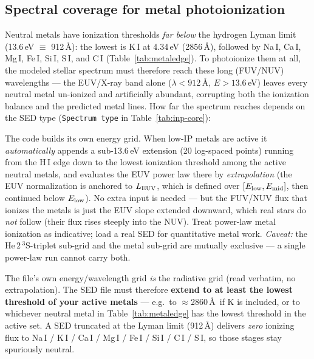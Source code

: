 \documentclass[english,a4paper]{kiseon_memo}
\begin{document}
\subsection{Spectral coverage for metal photoionization}\label{sec:metalsed}
Neutral metals have ionization thresholds \emph{far below} the hydrogen Lyman
limit (13.6\,eV $\equiv$ 912\,\AA): the lowest is K\,I at 4.34\,eV (2856\,\AA),
followed by Na\,I, Ca\,I, Mg\,I, Fe\,I, Si\,I, S\,I, and C\,I
(Table~\ref{tab:metaledge}). To photoionize them at all, the modeled stellar
spectrum must therefore reach these long (FUV/NUV) wavelengths --- the EUV/X-ray
band alone ($\lambda<912$\,\AA, $E>13.6$\,eV) leaves every neutral metal
un-ionized and artificially abundant, corrupting both the ionization balance and
the predicted metal lines. How far the spectrum reaches depends on the SED type
(\texttt{Spectrum type} in Table~\ref{tab:inp-core}):

\begin{description}\itemsep3pt
\item[\textmd{Power-law / monochromatic (\texttt{Power-law}).}]
  The code builds its own energy grid. When low-IP metals are active it
  \emph{automatically} appends a sub-13.6\,eV extension (20 log-spaced points)
  running from the H\,I edge down to the lowest ionization threshold among the
  active neutral metals, and evaluates the EUV power law there by
  \emph{extrapolation} (the EUV normalization is anchored to $L_{\rm EUV}$, which
  is defined over $[E_{\rm low},E_{\rm mid}]$, then continued below $E_{\rm low}$).
  No extra input is needed --- but the FUV/NUV flux that ionizes the metals is
  just the EUV slope extended downward, which real stars do \emph{not} follow
  (their flux rises steeply into the NUV). Treat power-law metal ionization as
  indicative; load a real SED for quantitative metal work. \emph{Caveat:} the
  He\,$2\,^3$S-triplet sub-grid and the metal sub-grid are mutually exclusive ---
  a single power-law run cannot carry both.
\item[\textmd{Loaded SED (\texttt{Load}, \texttt{SED file:}).}]
  The file's own energy/wavelength grid \emph{is} the radiative grid (read
  verbatim, no extrapolation). The SED file must therefore \textbf{extend to at
  least the lowest threshold of your active metals} --- e.g.\ to
  $\approx$2860\,\AA\ if K is included, or to whichever neutral metal in
  Table~\ref{tab:metaledge} has the lowest threshold in the active set. A SED
  truncated at the Lyman limit (912\,\AA) delivers \emph{zero} ionizing flux to
  Na\,I / K\,I / Ca\,I / Mg\,I / Fe\,I / Si\,I / C\,I / S\,I, so those stages stay
  spuriously neutral.
\end{description}
\end{document}
